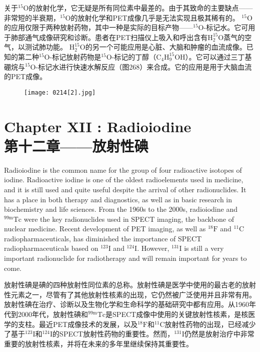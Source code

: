 \documentclass[dvipsnames, svgnames,a4paper,11pt]{article}
\begin{document}
关于\(\mathrm{^{15}O}\)的放射化学，它无疑是所有同位素中最差的。由于其致命的主要缺点——非常短的半衰期，\(\mathrm{^{15}O}\)的放射化学和PET成像几乎是无法实现且极其稀有的。 \(\mathrm{^{15}O}\)的应用仅限于两种放射药物，其中一种是实际的目标产物——\(\mathrm{^{15}O}\)-标记水。它可用于肺部通气成像研究和诊断。患者在PET扫描仪上吸入和呼出含有\(\mathrm{H_2^{15}O}\)蒸气的空气，以测试肺功能。 \(\mathrm{H_2^{15}O}\)的另一个可能应用是心脏、大脑和肿瘤的血流成像。已知的第二种\(\mathrm{^{15}O}\)-标记放射药物是\(\mathrm{^{15}O}\)-标记的丁醇（\(\mathrm{C_4H_9^{15}OH}\)）。它可以通过三丁基硼烷与\(\mathrm{^{15}O}\)-标记水进行快速水解反应（图268）来合成。它的应用是用于大脑血流的PET成像。

\begin{figure}[h]
	\centering
    \texttt{[image: 0214[2].jpg]}  
     \label{fig268}
\end{figure}

\newpage

\section{Chapter XII : Radioiodine \\第十二章——放射性碘}
Radioiodine is the common name for the group of four radioactive isotopes of iodine. Radioactive iodine is one of the oldest radioelements used in medicine, and it is still used and quite useful despite the arrival of other radionuclides. It has a place in both therapy and diagnostics, as well as in basic research in biochemistry and life sciences. From the 1960s to the 2000s, radioiodine and \(\mathrm{^{99m}Tc}\) were the key radionuclides used in SPECT imaging, the backbone of nuclear medicine. Recent development of PET imaging, as well as \(\mathrm{^{18}F}\) and \(\mathrm{^{11}C}\) radiopharmaceuticals, has diminished the importance of SPECT radiopharmaceuticals based on \(\mathrm{^{123}I}\) and \(\mathrm{^{124}I}\). However, \(\mathrm{^{131}I}\) is still a very important radionuclide for radiotherapy and will remain important for years to come.  

放射性碘是碘的四种放射性同位素的总称。放射性碘是医学中使用的最古老的放射性元素之一，尽管有了其他放射性核素的出现，它仍然被广泛使用并且非常有用。放射性碘在治疗、诊断以及生物化学和生命科学的基础研究中都有应用。从1960年代到2000年代，放射性碘和\(\mathrm{^{99m}Tc}\)是SPECT成像中使用的关键放射性核素，是核医学的支柱。最近PET成像技术的发展，以及\(\mathrm{^{18}F}\)和\(\mathrm{^{11}C}\)放射性药物的出现，已经减少了基于\(\mathrm{^{123}I}\)和\(\mathrm{^{124}I}\)的SPECT放射性药物的重要性。然而，\(\mathrm{^{131}I}\)仍然是放射治疗中非常重要的放射性核素，并将在未来的多年里继续保持其重要性。  
\end{document}
